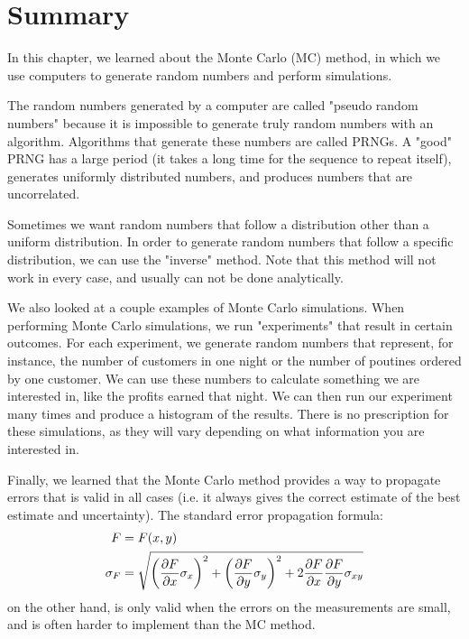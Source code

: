 \section{Summary}
\begin{chapterSummary}
In this chapter, we learned about the Monte Carlo (MC) method, in which we use computers to generate random numbers and perform simulations.

The random numbers generated by a computer are called "pseudo random numbers" because it is impossible to generate truly random numbers with an algorithm. Algorithms that generate these numbers are called PRNGs. A "good" PRNG has a large period (it takes a long time for the sequence to repeat itself), generates uniformly distributed numbers, and produces numbers that are uncorrelated.

Sometimes we want random numbers that follow a distribution other than a uniform distribution. In order to generate random numbers that follow a specific distribution, we can use the "inverse" method. Note that this method will not work in every case, and usually can not be done analytically.

We also looked at a couple examples of Monte Carlo simulations. When performing Monte Carlo simulations, we run "experiments" that result in certain outcomes. For each experiment, we generate random numbers that represent, for instance, the number of customers in one night or the number of poutines ordered by one customer. We can use these numbers to calculate something we are interested in, like the profits earned that night. We can then run our experiment many times and produce a histogram of the results. There is no prescription for these simulations, as they will vary depending on what information you are interested in.

Finally, we learned that the Monte Carlo method provides a way to propagate errors that is valid in all cases (i.e. it always gives the correct estimate of the best estimate and uncertainty). The standard error propagation formula:
\begin{align*}
F&=F(x,y)\\
\sigma_{F} &= \sqrt{\left(\frac{\partial F}{\partial x}\sigma_x\right)^2 + \left(\frac{\partial F}{\partial y} \sigma_y\right)^2+2\frac{\partial F}{\partial x}\frac{\partial F}{\partial y}\sigma_{xy}}
\end{align*}
on the other hand, is only valid when the errors on the measurements are small, and is often harder to implement than the MC method.


\end{chapterSummary}
